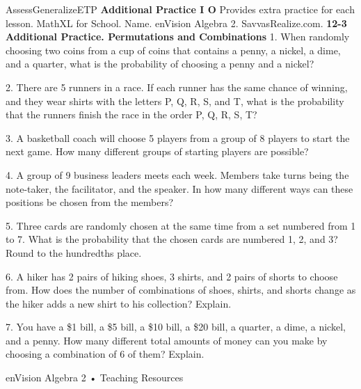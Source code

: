 \documentclass{article}
\newenvironment{te-addendum}[2]{}{}     %
\newcommand{\answer}[1]{}               %
\begin{document}
\begin{te-addendum}{Assess}{GeneralizeETP}
\textbf{Additional Practice I O}
Provides extra practice for each lesson. MathXL for School.
Name. enVision Algebra 2. SavvasRealize.com.
\textbf{12-3 Additional Practice. Permutations and Combinations}
1. When randomly choosing two coins from a cup of coins that contains a penny, a nickel, a dime, and a quarter, what is the probability of choosing a penny and a nickel?
\answer{(\frac16), 0.167, or 16.7\%}
2. There are 5 runners in a race. If each runner has the same chance of winning, and they wear shirts with the letters P, Q, R, S, and T, what is the probability that the runners finish the race in the order P, Q, R, S, T?
\answer{(\frac1{120})}
3. A basketball coach will choose 5 players from a group of 8 players to start the next game. How many different groups of starting players are possible?
\answer{56}
4. A group of 9 business leaders meets each week. Members take turns being the note-taker, the facilitator, and the speaker. In how many different ways can these positions be chosen from the members?
\answer{504 ways}
5. Three cards are randomly chosen at the same time from a set numbered from 1 to 7. What is the probability that the chosen cards are numbered 1, 2, and 3? Round to the hundredths place.
\answer{about 0.03}
6. A hiker has 2 pairs of hiking shoes, 3 shirts, and 2 pairs of shorts to choose from. How does the number of combinations of shoes, shirts, and shorts change as the hiker adds a new shirt to his collection? Explain.
\answer{Sample answer: Each time the hiker adds a shirt to the collection, 4 additional combinations are possible. The initial number of combinations is (2\cdot3\cdot2=12). When another shirt is added, the number of combinations becomes (2\cdot4\cdot2=16).}
7. You have a \$1 bill, a \$5 bill, a \$10 bill, a \$20 bill, a quarter, a dime, a nickel, and a penny. How many different total amounts of money can you make by choosing a combination of 6 of them? Explain.
\answer{28; Number of ways is ({}_8C_6=28).}
enVision Algebra 2 • Teaching Resources
\end{te-addendum}
\end{document}
